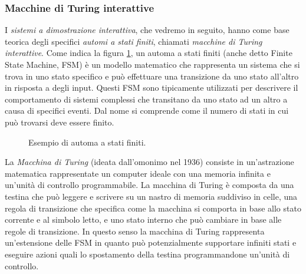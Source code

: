 \documentclass{article}
\theoremstyle{definition}
\begin{document}
\subsubsection{Macchine di Turing interattive}\label{turing}
I \emph{sistemi a dimostrazione interattiva}, che vedremo in seguito, hanno come base teorica degli specifici \emph{automi a stati finiti}, chiamati \emph{macchine di Turing interattive}.
Come indica la figura \ref{fig:fsm}, un automa a stati finiti (anche detto Finite State Machine, FSM) è un modello matematico che rappresenta un sistema che si trova in uno stato specifico e può effettuare una transizione da uno stato all'altro in risposta a degli input. Questi FSM sono tipicamente utilizzati per descrivere il comportamento di sistemi complessi che transitano da uno stato ad un altro a causa di specifici eventi. Dal nome si comprende come il numero di stati in cui può trovarsi deve essere finito.

\begin{figure}[H]
    \centering
    \caption{Esempio di automa a stati finiti.}
    \label{fig:fsm}
\end{figure}

La \emph{Macchina di Turing} (ideata dall'omonimo nel 1936) consiste in un'astrazione matematica rappresentate un computer ideale con una memoria infinita e un'unità di controllo programmabile. La macchina di Turing è composta da una testina che può leggere e scrivere su un nastro di memoria suddiviso in celle, una regola di transizione che specifica come la macchina si comporta in base allo stato corrente e al simbolo letto, e uno stato interno che può cambiare in base alle regole di transizione. In questo senso la macchina di Turing rappresenta un'estensione delle FSM in quanto può potenzialmente supportare infiniti stati e eseguire azioni quali lo spostamento della testina programmandone un'unità di controllo.
\end{document}
